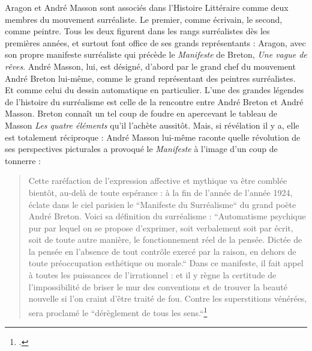 Aragon et André Masson sont associés dans l’Histoire Littéraire comme deux membres du mouvement surréaliste. Le premier, comme écrivain, le second, comme peintre. Tous les deux figurent dans les rangs surréalistes dès les premières années, et surtout font office de ses grands représentants : Aragon, avec son propre manifeste surréaliste qui précède le \emph{Manifeste} de Breton, \emph{Une vague de rêves}. André Masson, lui, est désigné, d’abord par le grand chef du mouvement André Breton lui-même, comme le grand représentant des peintres surréalistes. Et comme celui du dessin automatique en particulier. L’une des grandes légendes de l’histoire du surréalisme est celle de la rencontre entre André Breton et André Masson. Breton connaît un tel coup de foudre en apercevant le tableau de Masson \emph{Les quatre éléments }qu’il l’achète aussitôt. Mais, si révélation il y a, elle est totalement réciproque : André Masson lui-même raconte quelle révolution de ses perspectives picturales a provoqué le \emph{Manifeste} à l’image d’un coup de tonnerre : 

\begin{quote}Cette raréfaction de l’expression affective et mythique va être comblée bientôt, au-delà de toute espérance : à la fin de l’année de l’année 1924, éclate dans le ciel parisien le “Manifeste du Surréalisme“ du grand poëte André Breton. Voici sa définition du surréalisme : “Automatisme psychique pur par lequel on se propose d’exprimer, soit verbalement soit par écrit, soit de toute autre manière, le fonctionnement réel de la pensée. Dictée de la pensée en l’absence de tout contrôle exercé par la raison, en dehors de toute préoccupation esthétique ou morale.“ Dans ce manifeste, il fait appel à toutes les puissances de l’irrationnel : et il y règne la certitude de l’impossibilité de briser le mur des conventions et de trouver la beauté nouvelle si l’on craint d’être traité de fou. Contre les superstitions vénérées, sera proclamé le “dérèglement de tous les sens.“\footcite[p21]{rebelle}\end{quote}	
		
